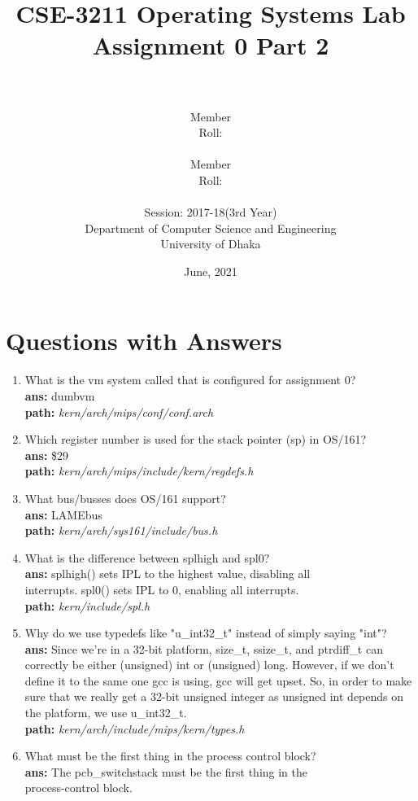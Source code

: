 \documentclass[14pt, a4paper]{article}
\title{\textbf{CSE-3211 Operating Systems Lab\\Assignment 0 Part 2}}
\author{\\\\
        Member \\
        Roll: \\\\
        
        Member \\
        Roll: \\\\
        
        Session: 2017-18(3rd Year)\\
        Department of Computer Science and Engineering\\
        University of Dhaka}
\date{June, 2021}
\begin{document}
\maketitle
\newpage

\section{Questions with Answers}

\begin{enumerate}
    \item What is the vm system called that is configured for assignment 0?\\
          \textbf{ans: } dumbvm\\
          \textbf{path:} \emph{kern/arch/mips/conf/conf.arch}
    \item Which register number is used for the stack pointer (sp) in OS/161?\\
          \textbf{ans: } \$29\\
          \textbf{path:} \emph{ kern/arch/mips/include/kern/regdefs.h}
    \item What bus/busses does OS/161 support?\\
          \textbf{ans: } LAMEbus\\
          \textbf{path:} \emph{kern/arch/sys161/include/bus.h}
    \item What is the difference between splhigh and spl0?\\
          \textbf{ans: } splhigh() sets IPL to the highest value, disabling all\\
          interrupts. spl0() sets IPL to 0, enabling all interrupts.\\
          \textbf{path:} \emph{ kern/include/spl.h}
     \item Why do we use typedefs like "u\_int32\_t" instead of simply saying "int"?\\
        \textbf{ans: } Since we’re in a 32-bit platform, size\_t, ssize\_t, and ptrdiff\_t can correctly be either (unsigned) int or (unsigned) long. However, if we don’t define it to the same one gcc is using, gcc will get upset. So, in order to make sure that we really get a 32-bit unsigned integer as unsigned int depends on the platform, we use u\_int32\_t.\\
        \textbf{path:} \emph{kern/arch/include/mips/kern/types.h}
    \item What must be the first thing in the process control block?\\
          \textbf{ans: } The pcb\_switchstack must be the first thing in the\\ process-control block.\\

\end{enumerate}
\end{document}
